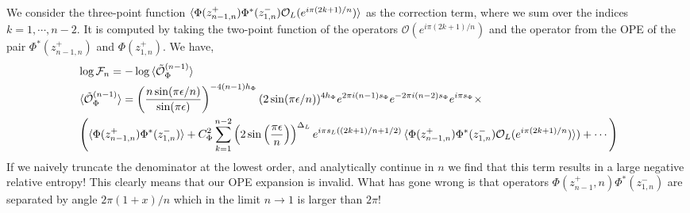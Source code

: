 \documentclass[11pt]{article}
\newcommand{\ep}{\epsilon}
\newcommand{\mO}{\mathcal{O}}
\newcommand{\nn}{\nonumber}
\newcommand{\lb}{\left(}
\newcommand{\rb}{\right)}
\newcommand{\JM}[1]{\textcolor{orange}{#1}}
\begin{document}
We consider the three-point function  $\braket{\Phi(z^+_{n-1,n})\Phi^*(z^-_{1,n}) \mO_L(e^{i\pi (2k+1)/n})}$ as the correction term, where we sum over the indices $k = 1, \cdots , n-2$. It is computed by taking the two-point function of the operators $\mO(e^{i \pi (2k+1)/n})$ and the operator from the OPE of the pair $\Phi^*(z^+_{n-1,n})$ and $\Phi(z^+_{1,n})$. We have, 
\begin{align}
  &\log\mathcal{F}_n=-\log\braket{\tilde{\mO}_{\Phi}^{(n-1)}}\nn \\
&\braket{\tilde{\mO}_{\Phi}^{(n-1)}}=\lb \frac{n \sin(\pi\ep/n)}{\sin(\pi\ep)}\rb^{-4(n-1)h_\Phi}(2\sin(\pi\ep/n))^{4h_\Phi}e^{2\pi i(n-1)s_\Phi  }e^{-2\pi i(n-2) s_\Phi}e^{i\pi s_\Phi}\times \nn\\
&\lb\braket{\Phi(z^+_{n-1,n})\Phi^*(z^-_{1,n})}+C_\Phi^2 \sum_{k=1}^{n-2} \lb 2\sin\lb\frac{\pi\epsilon}{n}\rb\rb^{\Delta_L}e^{i\pi s_L((2k+1)/n + 1/2)}\braket{\Phi(z^+_{n-1,n})\Phi^*(z^-_{1,n}) \mO_L(e^{i\pi (2k+1)/n})})+\cdots\rb
\end{align}
If we naively truncate the denominator at the lowest order, and analytically continue in $n$ we find that this term results in a large negative relative entropy! This clearly means that our OPE expansion is invalid. What has gone wrong is that operators $\Phi(z^+_{n-1},n)\Phi^*(z^-_{1,n})$ are separated by angle $2\pi(1+x)/n$ which in the limit $n\to 1$ is larger than $2\pi$! 
\end{document}
